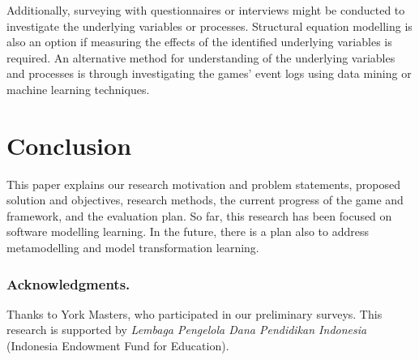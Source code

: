 \documentclass[runningheads,a4paper]{llncs}
\begin{document}
Additionally, surveying with questionnaires or interviews might be conducted to investigate the underlying variables or processes. Structural equation modelling \cite{hair2016primer} is also an option if measuring the effects of the identified underlying variables is required. An alternative method for understanding of the underlying variables and processes is through investigating the games' event logs using data mining or machine learning techniques.

\section{Conclusion}
This paper explains our research motivation and problem statements, proposed solution and objectives, research methods, the current progress of the game and framework, and the evaluation plan. So far, this research has been focused on software modelling learning. In the future, there is a plan also to address metamodelling and model transformation learning. 

\subsubsection*{Acknowledgments.} Thanks to York Masters, who participated in our preliminary surveys. This research is supported by \emph{Lembaga Pengelola Dana Pendidikan Indonesia} (Indonesia Endowment Fund for Education). 

 

\end{document}
